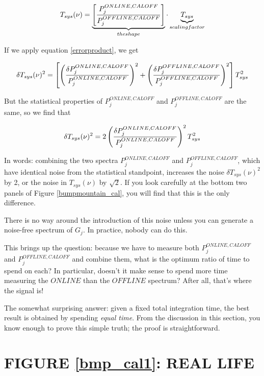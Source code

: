 \begin{equation} 
T_{sys}(\nu) = 
\underbrace{\left[ {P_j^{ONLINE, CALOFF} \over P_j^{OFFLINE, CALOFF}} 
\right]}_{the shape} \cdot
\underbrace{ T_{sys}}_{scaling factor}   
\end{equation}

\noindent If we apply equation \ref{errorproduct}, we get

\begin{equation}
\delta T_{sys}(\nu)^2 = 
\left[ \left( {\delta P_j^{ONLINE, CALOFF} \over P_j^{ONLINE,
CALOFF}} \right)^2 +  \left( {\delta P_j^{OFFLINE, CALOFF} \over P_j^{OFFLINE,
CALOFF}} \right)^2 \right] T_{sys}^2
\end{equation}

\noindent But the statistical properties of $P_j^{ONLINE, CALOFF}$ and
$P_j^{OFFLINE, CALOFF}$ are the same, so we find that

\begin{equation}
\delta T_{sys}(\nu)^2 = 2 
 \left( {\delta P_j^{ONLINE, CALOFF} \over P_j^{ONLINE,
CALOFF}} \right)^2 T_{sys}^2
\end{equation}

	In words: combining the two spectra $P_j^{ONLINE, CALOFF}$ and
$P_j^{OFFLINE, CALOFF}$, which have identical noise from the statistical
standpoint, increases the noise $\delta T_{sys}(\nu)^2$ by 2, or the
noise in $T_{sys}(\nu)$ by $\sqrt 2$. If you look carefully at the
bottom two panels of Figure \ref{bumpmountain_cal}, you will find that
this is the only difference. 

	There is no way around the introduction of this noise unless you
can generate a noise-free spectrum of $G_j$. In practice, nobody can do
this. 

	This brings up the question: because we have to measure both
$P_j^{ONLINE, CALOFF}$ and $P_j^{OFFLINE, CALOFF}$ and combine them, what
is the optimum ratio of time to spend on each? In particular, doesn't it
make sense to spend more time measuring the $ONLINE$ than the $OFFLINE$
spectrum? After all, that's where the signal is! 

	The somewhat surprising answer: given a fixed total integration
time, the best result is obtained by spending {\it equal time}. From the
discussion in this section, you know enough to prove this simple truth;
the proof is straightforward.

\section{FIGURE \ref{bmp_cal1}: REAL LIFE} \label{figure3}

